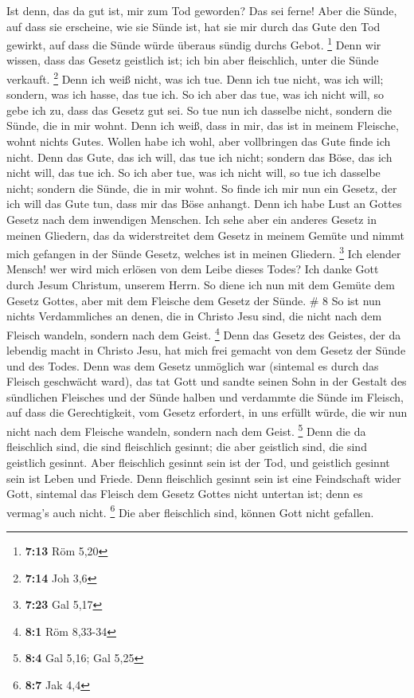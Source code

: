  Ist denn, das da gut ist, mir zum Tod geworden? Das sei
ferne! Aber die Sünde, auf dass sie erscheine, wie sie Sünde ist, hat
sie mir durch das Gute den Tod gewirkt, auf dass die Sünde würde überaus
sündig durchs Gebot. \footnote{\textbf{7:13} Röm 5,20} 
Denn wir wissen, dass das Gesetz geistlich ist; ich bin aber
fleischlich, unter die Sünde verkauft. \footnote{\textbf{7:14} Joh 3,6}
 Denn ich weiß nicht, was ich tue. Denn ich tue nicht, was
ich will; sondern, was ich hasse, das tue ich.  So ich aber
das tue, was ich nicht will, so gebe ich zu, dass das Gesetz gut sei.
 So tue nun ich dasselbe nicht, sondern die Sünde, die in
mir wohnt.  Denn ich weiß, dass in mir, das ist in meinem
Fleische, wohnt nichts Gutes. Wollen habe ich wohl, aber vollbringen das
Gute finde ich nicht.  Denn das Gute, das ich will, das tue
ich nicht; sondern das Böse, das ich nicht will, das tue ich.
 So ich aber tue, was ich nicht will, so tue ich dasselbe
nicht; sondern die Sünde, die in mir wohnt.  So finde ich
mir nun ein Gesetz, der ich will das Gute tun, dass mir das Böse
anhangt.  Denn ich habe Lust an Gottes Gesetz nach dem
inwendigen Menschen.  Ich sehe aber ein anderes Gesetz in
meinen Gliedern, das da widerstreitet dem Gesetz in meinem Gemüte und
nimmt mich gefangen in der Sünde Gesetz, welches ist in meinen Gliedern.
\footnote{\textbf{7:23} Gal 5,17}  Ich elender Mensch! wer
wird mich erlösen von dem Leibe dieses Todes?  Ich danke
Gott durch Jesum Christum, unserem Herrn. So diene ich nun mit dem
Gemüte dem Gesetz Gottes, aber mit dem Fleische dem Gesetz der Sünde. \#
8  So ist nun nichts Verdammliches an denen, die in Christo
Jesu sind, die nicht nach dem Fleisch wandeln, sondern nach dem Geist.
\footnote{\textbf{8:1} Röm 8,33-34}  Denn das Gesetz des
Geistes, der da lebendig macht in Christo Jesu, hat mich frei gemacht
von dem Gesetz der Sünde und des Todes.  Denn was dem Gesetz
unmöglich war (sintemal es durch das Fleisch geschwächt ward), das tat
Gott und sandte seinen Sohn in der Gestalt des sündlichen Fleisches und
der Sünde halben und verdammte die Sünde im Fleisch,  auf
dass die Gerechtigkeit, vom Gesetz erfordert, in uns erfüllt würde, die
wir nun nicht nach dem Fleische wandeln, sondern nach dem Geist.
\footnote{\textbf{8:4} Gal 5,16; Gal 5,25}  Denn die da
fleischlich sind, die sind fleischlich gesinnt; die aber geistlich sind,
die sind geistlich gesinnt.  Aber fleischlich gesinnt sein
ist der Tod, und geistlich gesinnt sein ist Leben und Friede.
 Denn fleischlich gesinnt sein ist eine Feindschaft wider
Gott, sintemal das Fleisch dem Gesetz Gottes nicht untertan ist; denn es
vermag's auch nicht. \footnote{\textbf{8:7} Jak 4,4}  Die
aber fleischlich sind, können Gott nicht gefallen.

